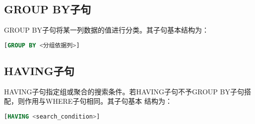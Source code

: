 \documentclass[a4paper]{uestcreport}
\begin{document}
\subsection{GROUP BY子句}
GROUP BY子句将某一列数据的值进行分类。其子句基本结构为：
\begin{lstlisting}[language=SQL]
    [GROUP BY <分组依据列>]
\end{lstlisting}

\subsection{HAVING子句}
HAVING子句指定组或聚合的搜索条件。若HAVING子句不予GROUP BY子句搭配，则作用与WHERE子句相同。其子句基本
结构为：
\begin{lstlisting}[language=SQL]
    [HAVING <search_condition>]
\end{lstlisting}
\end{document}
